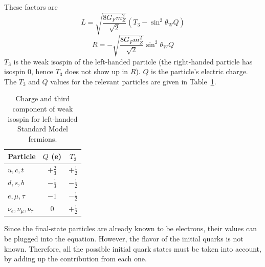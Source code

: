 These factors are 
\[
L = \sqrt{ \frac{8 G_F m_Z^2}{\sqrt{2} } }(T_3 - \sin^2 \theta_W Q)
\]
\[
R = - \sqrt{ \frac{8 G_F m_Z^2}{\sqrt{2} } } \sin^2 \theta_W Q
\]
$T_3$ is the weak isospin of the left-handed particle 
(the right-handed particle has isospin 0, 
hence $T_3$ does not show up in $R$). 
$Q$ is the particle's electric charge.  
The $T_3$ and $Q$ values for the relevant particles are 
given in Table~\ref{TableWeakNumbers}.  

\begin{table}[htbp]
  \begin{center}
    \caption{Charge and third component of weak isospin for 
      left-handed Standard Model fermions.}
    \label{TableWeakNumbers}
    \begin{tabular}[]{ | l | c | c | }
      \hline
      Particle & $Q$ (e) & $T_3$  \\ \hline \hline
      $u,c,t$ & $+\frac{2}{3}$ & $+\frac{1}{2}$ \\ \hline
      $d,s,b$ & $-\frac{1}{3}$ & $-\frac{1}{2}$ \\ \hline
      $e,\mu,\tau$ & $-1$ & $-\frac{1}{2}$ \\ \hline
      $\nu_e, \nu_{\mu}, \nu_{\tau}$ & $0$ & $+\frac{1}{2}$ \\ \hline
    \end{tabular}
  \end{center}
\end{table}




Since the final-state particles are already known to be electrons, 
their values can be plugged into the equation.  
However, the flavor of the initial quarks is not known.  
Therefore, all the possible initial quark states must 
be taken into account, by adding up the contribution from each one.  


